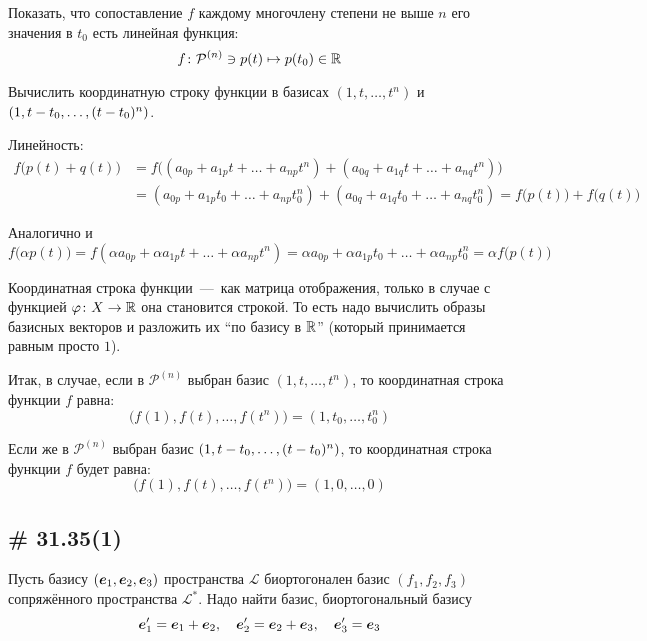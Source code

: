 \documentclass[a4paper,12pt]{article}
\begin{document}
  Показать, что сопоставление $f$ каждому многочлену степени не выше $n$ его значения в $t_0$ есть линейная функция:
  \[
    f\colon \mathcal P^{(n)} \ni p(t) \mapsto p(t_0) \in \operatorname{\mathbb R}
  \]
  
  Вычислить координатную строку функции в базисах $(1, t, \ldots, t^n)$ и $(1, t \hm- t_0, \ldots, (t \hm- t_0)^n)$.
  
  \begin{solution}
    Линейность:
    \begin{equation*}
    \begin{split}
      f\bigl(p(t) + q(t)\bigr) &= f\bigl((a_{0p} + a_{1p} t + \ldots + a_{np} t^n) + (a_{0q} + a_{1q} t + \ldots + a_{nq} t^n)\bigr)\\
      &= (a_{0p} + a_{1p} t_0 + \ldots + a_{np} t_0^n) + (a_{0q} + a_{1q} t_0 + \ldots + a_{nq} t_0^n)
      = f\bigl(p(t)\bigr) + f\bigl(q(t)\bigr)
    \end{split}
    \end{equation*}
    
    Аналогично и
    \[
      f\bigl(\alpha p(t)\bigr) = f(\alpha a_{0p} + \alpha a_{1p} t + \ldots + \alpha a_{np} t^n)
      = \alpha a_{0p} + \alpha a_{1p} t_0 + \ldots + \alpha a_{np} t_0^n
      = \alpha f\bigl(p(t)\bigr)
    \]
    
    Координатная строка функции~---~как матрица отображения, только в случае с функцией $\phi\colon X \hm\to \RR$ она становится строкой.
    То есть надо вычислить образы базисных векторов и разложить их ``по базису в $\operatorname{\mathbb R}$'' (который принимается равным просто $1$).
    
    Итак, в случае, если в $\mathcal P^{(n)}$ выбран базис $(1, t, \ldots, t^n)$, то координатная строка функции $f$ равна:
    \[
      \bigl(f(1), f(t), \ldots, f(t^n)\bigr) = (1, t_0, \ldots, t_0^n)
    \]
    
    Если же в $\mathcal P^{(n)}$ выбран базис $(1, t \hm- t_0, \ldots, (t \hm- t_0)^n)$, то координатная строка функции $f$ будет равна:
    \[
      \bigl(f(1), f(t), \ldots, f(t^n)\bigr) = (1, 0, \ldots, 0)
    \]
  \end{solution}
  
  
  \subsection{\# 31.35(1)}
  
  Пусть базису $(\boldsymbol e_1, \boldsymbol e_2, \boldsymbol e_3)$ пространства $\mathcal L$ биортогонален базис $(f_1, f_2, f_3)$ сопряжённого пространства $\mathcal L^*$.
  Надо найти базис, биортогональный базису
  \[
    \boldsymbol e_1' = \boldsymbol e_1 + \boldsymbol e_2,
    \quad \boldsymbol e_2' = \boldsymbol e_2 + \boldsymbol e_3,
    \quad \boldsymbol e_3' = \boldsymbol e_3
  \]
  
\end{document}
